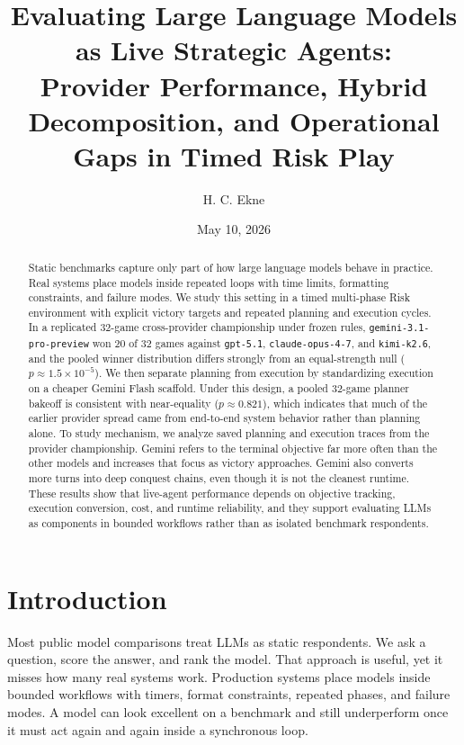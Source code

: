 \documentclass[11pt]{article}
\title{\textbf{Evaluating Large Language Models as Live Strategic Agents:}\\
Provider Performance, Hybrid Decomposition, and Operational Gaps in Timed Risk Play}
\author{H. C. Ekne}
\date{May 10, 2026}
\begin{document}
\maketitle

\begin{abstract}
Static benchmarks capture only part of how large language models behave in practice. Real systems place models inside repeated loops with time limits, formatting constraints, and failure modes. We study this setting in a timed multi-phase Risk environment with explicit victory targets and repeated planning and execution cycles. In a replicated 32-game cross-provider championship under frozen rules, \texttt{gemini-3.1-pro-preview} won 20 of 32 games against \texttt{gpt-5.1}, \texttt{claude-opus-4-7}, and \texttt{kimi-k2.6}, and the pooled winner distribution differs strongly from an equal-strength null ($p \approx 1.5\times10^{-5}$). We then separate planning from execution by standardizing execution on a cheaper Gemini Flash scaffold. Under this design, a pooled 32-game planner bakeoff is consistent with near-equality ($p \approx 0.821$), which indicates that much of the earlier provider spread came from end-to-end system behavior rather than planning alone. To study mechanism, we analyze saved planning and execution traces from the provider championship. Gemini refers to the terminal objective far more often than the other models and increases that focus as victory approaches. Gemini also converts more turns into deep conquest chains, even though it is not the cleanest runtime. These results show that live-agent performance depends on objective tracking, execution conversion, cost, and runtime reliability, and they support evaluating LLMs as components in bounded workflows rather than as isolated benchmark respondents.
\end{abstract}

\section{Introduction}

Most public model comparisons treat LLMs as static respondents. We ask a question, score the answer, and rank the model. That approach is useful, yet it misses how many real systems work. Production systems place models inside bounded workflows with timers, format constraints, repeated phases, and failure modes. A model can look excellent on a benchmark and still underperform once it must act again and again inside a synchronous loop.
\end{document}
